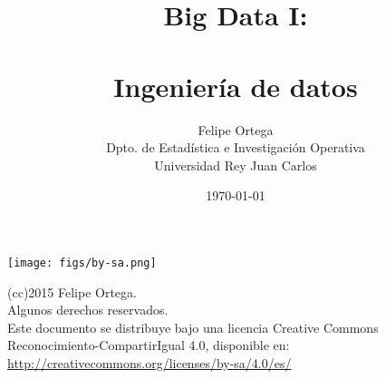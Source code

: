 \documentclass[10pt]{beamer}
\title[Big Data I: Ingeniería de datos]
{Big Data I:\\~\\
Ingeniería de datos}
\author[Felipe Ortega]{
Felipe Ortega\\
Dpto. de Estadística e Investigación Operativa\\
Universidad Rey Juan Carlos
}
\date{\today}
\begin{document}
{ 
\begin{frame}
  \titlepage
\end{frame}
} \addtocounter{framenumber}{-1}

\begin{frame}{}
 \vspace{3cm}
 \begin{flushright}
 \texttt{[image: figs/by-sa.png]}\\
    \begin{small}(cc)2015 Felipe Ortega.\\
    Algunos derechos reservados.\\
    Este documento se distribuye bajo una licencia
    Creative Commons Reconocimiento-CompartirIgual 4.0,
    disponible en:
    \url{http://creativecommons.org/licenses/by-sa/4.0/es/} 
    \end{small}
 \end{flushright}
 
\end{frame}


% 




%
\end{document}
